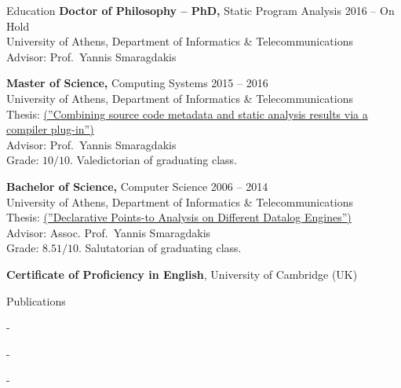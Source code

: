 \documentclass{resume}
\begin{document}
\newpage
\begin{rSection}{Education}
  {\bf Doctor of Philosophy -- PhD,} Static Program Analysis \hfill {2016 -- On Hold } \\
  University of Athens,  Department of Informatics \& Telecommunications \\
  Advisor: Prof.~Yannis Smaragdakis

  {\bf Master of Science,} Computing Systems \hfill {2015 -- 2016 } \\
  University of Athens,  Department of Informatics \& Telecommunications \\
  Thesis: \href{http://cgi.di.uoa.gr/~smaragd/theses/antoniadis2.pdf}{ (''Combining source code metadata and static analysis results via a compiler plug-in'')} \\
  Advisor: Prof.~Yannis Smaragdakis \\
  Grade: $10 / 10$. Valedictorian of graduating class.

  {\bf Bachelor of Science,}  Computer Science \hfill {2006 -- 2014}  \\
  University of Athens,  Department of Informatics \& Telecommunications \\
  Thesis: \href{http://cgi.di.uoa.gr/~smaragd/theses/antoniadis.pdf}{ (''Declarative Points-to Analysis on Different Datalog Engines'')} \\
  Advisor: Assoc. Prof.~Yannis Smaragdakis \\
  Grade: $8.51 / 10$. Salutatorian of graduating class.

  {\bf Certificate of Proficiency in English}, University of Cambridge (UK)
\end{rSection}

\begin{rSection}{Publications}
  \begin{rSubsection}{}{}{}{}
      \item[-] 
      \item[-] 
      \item[-] 
  \end{rSubsection}
\end{rSection}
\end{document}

